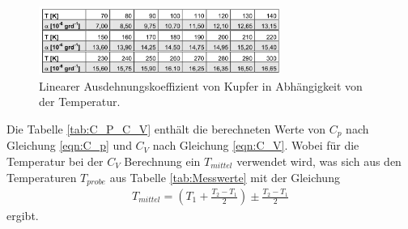 \begin{figure}
  \centering
  \includegraphics[width=0.7\textwidth]{alpha.PNG}
  \caption{Linearer Ausdehnungskoeffizient von Kupfer in Abhängigkeit von der Temperatur.}
  \label{fig:alpha}
\end{figure}

Die Tabelle \ref{tab:C_P_C_V} enthält die berechneten Werte von $C_p$ nach Gleichung \eqref{eqn:C_p} und $C_V$ nach Gleichung \eqref{eqn:C_V}.
Wobei für die Temperatur bei der $C_V$ Berechnung ein $T_{mittel}$ verwendet wird, was sich aus den Temperaturen $T_{probe}$ aus Tabelle \ref{tab:Messwerte}
mit der Gleichung
\begin{align}
  T_{mittel} = \left(T_1 + \frac{T_2-T_1}{2}\right)  \pm \frac{T_2-T_1}{2}
\end{align}
ergibt.

